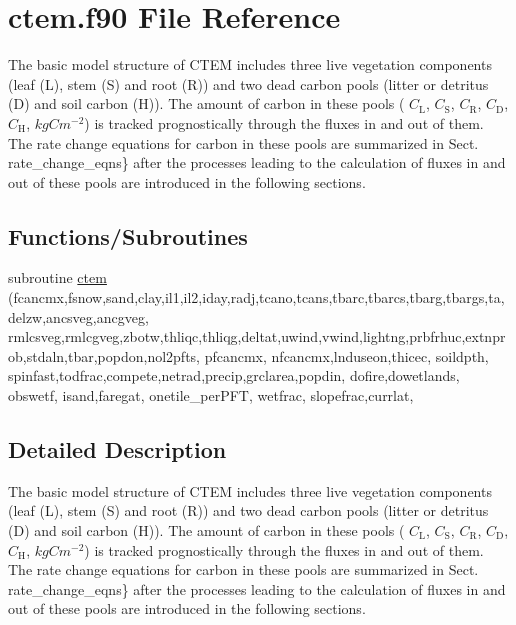 \hypertarget{ctem_8f90}{}\section{ctem.\+f90 File Reference}
\label{ctem_8f90}


The basic model structure of C\+T\+E\+M includes three live vegetation components (leaf (L), stem (S) and root (R)) and two dead carbon pools (litter or detritus (D) and soil carbon (H)). The amount of carbon in these pools ( $C_\mathrm{L}$, $C_\mathrm{S}$, $C_\mathrm{R}$, $C_\mathrm{D}$, $C_\mathrm{H}$, $kgC m^{-2}$) is tracked prognostically through the fluxes in and out of them. The rate change equations for carbon in these pools are summarized in Sect. rate\+\_\+change\+\_\+eqns\} after the processes leading to the calculation of fluxes in and out of these pools are introduced in the following sections.  


\subsection*{Functions/\+Subroutines}
\begin{DoxyCompactItemize}
\item 
subroutine \hyperlink{ctem_8f90_aeac1eecbe7347b17101ecc2cf445f146}{ctem} (fcancmx,fsnow,sand,clay,il1,il2,iday,radj,tcano,tcans,tbarc,tbarcs,tbarg,tbargs,ta,delzw,ancsveg,ancgveg, rmlcsveg,rmlcgveg,zbotw,thliqc,thliqg,deltat,uwind,vwind,lightng,prbfrhuc,extnprob,stdaln,tbar,popdon,nol2pfts, pfcancmx, nfcancmx,lnduseon,thicec, soildpth, spinfast,todfrac,compete,netrad,precip,grclarea,popdin, dofire,dowetlands, obswetf, isand,faregat, onetile\+\_\+per\+P\+F\+T, wetfrac, slopefrac,currlat,
\end{DoxyCompactItemize}


\subsection{Detailed Description}
The basic model structure of C\+T\+E\+M includes three live vegetation components (leaf (L), stem (S) and root (R)) and two dead carbon pools (litter or detritus (D) and soil carbon (H)). The amount of carbon in these pools ( $C_\mathrm{L}$, $C_\mathrm{S}$, $C_\mathrm{R}$, $C_\mathrm{D}$, $C_\mathrm{H}$, $kgC m^{-2}$) is tracked prognostically through the fluxes in and out of them. The rate change equations for carbon in these pools are summarized in Sect. rate\+\_\+change\+\_\+eqns\} after the processes leading to the calculation of fluxes in and out of these pools are introduced in the following sections. 



